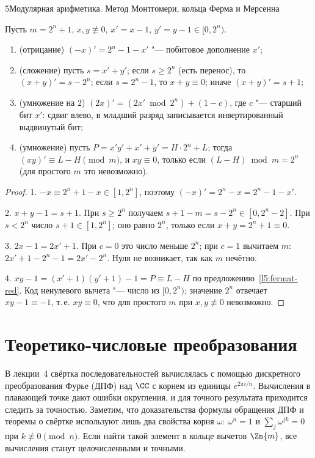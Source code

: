 \begin{lecture}{5}{Модулярная арифметика. Метод Монтгомери, кольца Ферма и Мерсенна}
\begin{proposition}\label{l5:dim1}
Пусть $m = 2^n + 1$, $x, y \not\equiv 0$, $x' = x - 1$, $y' = y - 1 \in [0, 2^n)$.
\begin{enumerate}
  \item (отрицание) $(-x)' = 2^n - 1 - x'$ "--- побитовое дополнение $x'$;
  \item (сложение) пусть $s = x' + y'$; если $s \ge 2^n$ (есть перенос), то
    $(x + y)' = s - 2^n$; если $s = 2^n - 1$, то $x + y \equiv 0$; иначе $(x + y)' = s + 1$;
  \item (умножение на $2$) $(2x)' = (2x' \bmod 2^n) + (1 - c)$, где $c$ "--- старший бит $x'$:
    сдвиг влево, в младший разряд записывается инвертированный выдвинутый бит;
  \item (умножение) пусть $P = x'y' + x' + y' = H \cdot 2^n + L$; тогда
    $(xy)' \equiv L - H \pmod m$, и $xy \equiv 0$, только если $(L - H) \bmod m = 2^n$
    (для простого $m$ это невозможно).
\end{enumerate}
\end{proposition}

\begin{proof}
1. $-x \equiv 2^n + 1 - x \in [1, 2^n]$, поэтому $(-x)' = 2^n - x = 2^n - 1 - x'$.

2. $x + y - 1 = s + 1$. При $s \ge 2^n$ получаем $s + 1 - m = s - 2^n \in [0, 2^n - 2]$. При
$s < 2^n$ число $s + 1 \in [1, 2^n]$; оно равно $2^n$, только если $x + y = 2^n + 1 \equiv 0$.

3. $2x - 1 = 2x' + 1$. При $c = 0$ это число меньше $2^n$; при $c = 1$ вычитаем $m$:
$2x' + 1 - 2^n - 1 = 2x' - 2^n$. Нуля не возникает, так как $m$ нечётно.

4. $xy - 1 = (x' + 1)(y' + 1) - 1 = P \equiv L - H$ по предложению~\ref{l5:fermat-red}.
Код ненулевого вычета "--- число из $[0, 2^n)$; значение $2^n$ отвечает $xy - 1 \equiv -1$,
т.\,е. $xy \equiv 0$, что для простого $m$ при $x, y \not\equiv 0$ невозможно.
\end{proof}



\section{Теоретико-числовые преобразования}

В лекции~4 свёртка последовательностей вычислялась с помощью дискретного преобразования Фурье
(ДПФ) над $\CC$ с корнем из единицы $e^{2\pi i/n}$. Вычисления в плавающей точке дают ошибки
округления, и для точного результата приходится следить за точностью. Заметим, что
доказательства формулы обращения ДПФ и теоремы о свёртке используют лишь два свойства корня
$\omega$: $\omega^n = 1$ и $\sum_{j} \omega^{jk} = 0$ при $k \not\equiv 0 \pmod n$. Если найти
такой элемент в кольце вычетов $\Zn{m}$, все вычисления станут целочисленными и точными.


\end{lecture}
